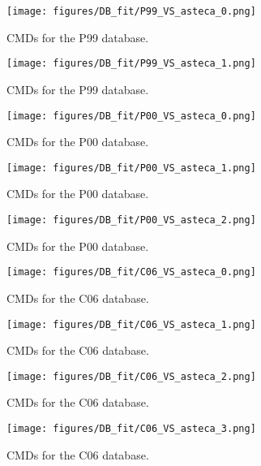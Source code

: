 \documentclass[draft]{aa}
\begin{document}
\begin{appendix}
\begin{figure*}
\texttt{[image: figures/DB\_fit/P99\_VS\_asteca\_0.png]}
\caption{CMDs for the P99 database.}
\label{fig:DBs_P99_0}
\end{figure*}
\clearpage

\begin{figure*}
\texttt{[image: figures/DB\_fit/P99\_VS\_asteca\_1.png]}
\caption{CMDs for the P99 database.}
\label{fig:DBs_P99_1}
\end{figure*}
\clearpage

\begin{figure*}
\texttt{[image: figures/DB\_fit/P00\_VS\_asteca\_0.png]}
\caption{CMDs for the P00 database.}
\label{fig:DBs_P00_0}
\end{figure*}
\clearpage

\begin{figure*}
\texttt{[image: figures/DB\_fit/P00\_VS\_asteca\_1.png]}
\caption{CMDs for the P00 database.}
\label{fig:DBs_P00_1}
\end{figure*}
\clearpage

\begin{figure*}
\texttt{[image: figures/DB\_fit/P00\_VS\_asteca\_2.png]}
\caption{CMDs for the P00 database.}
\label{fig:DBs_P00_2}
\end{figure*}
\clearpage

\begin{figure*}
\texttt{[image: figures/DB\_fit/C06\_VS\_asteca\_0.png]}
\caption{CMDs for the C06 database.}
\label{fig:DBs_C06_0}
\end{figure*}
\clearpage

\begin{figure*}
\texttt{[image: figures/DB\_fit/C06\_VS\_asteca\_1.png]}
\caption{CMDs for the C06 database.}
\label{fig:DBs_C06_1}
\end{figure*}
\clearpage

\begin{figure*}
\texttt{[image: figures/DB\_fit/C06\_VS\_asteca\_2.png]}
\caption{CMDs for the C06 database.}
\label{fig:DBs_C06_2}
\end{figure*}
\clearpage

\begin{figure}
\texttt{[image: figures/DB\_fit/C06\_VS\_asteca\_3.png]}
\caption{CMDs for the C06 database.}
\label{fig:DBs_C06_3}
\end{figure}
\clearpage


\end{appendix}
\end{document}
